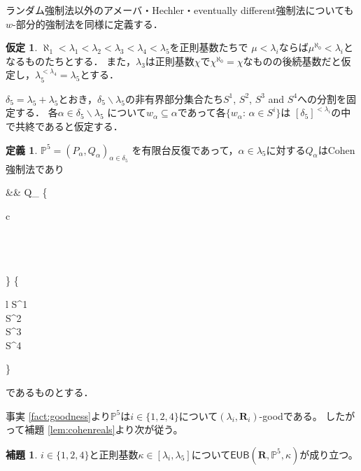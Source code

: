 \documentclass[uplatex,dvipdfmx]{jsarticle}
\newcommand{\EUB}{\mathsf{EUB}}
\newcommand{\relR}{\mathbf{R}}
\newcommand{\Pa}{\mathbb{P}^5}
\renewcommand{\setminus}{\smallsetminus}
\theoremstyle{definition}
\newtheorem{defi}[thm]{定義}
\newtheorem{lem}[thm]{補題}
\newtheorem{assumption}[thm]{仮定}
\begin{document}
	ランダム強制法以外のアメーバ・Hechler・eventually different強制法についても$w$-部分的強制法を同様に定義する．
	
	\begin{assumption}\label{asm:P}
		$\aleph_1<\lambda_1<\lambda_2<\lambda_3<\lambda_4<\lambda_5$を正則基数たちで
		$\mu<\lambda_i$ならば$\mu^{\aleph_0}<\lambda_i$となるものたちとする．
		また，$\lambda_3$は正則基数$\chi$で$\chi^{\aleph_0}=\chi$なものの後続基数だと仮定し，$\lambda_5^{<\lambda_4}=\lambda_5$とする．
		
		$\delta_5=\lambda_5+\lambda_5$とおき，$\delta_5\setminus\lambda_5$の非有界部分集合たち$S^1$, $S^2$, $S^3$ and $S^4$への分割を固定する．
		各$\alpha\in \delta_5\setminus\lambda_5$ について$w_\alpha\subseteq \alpha$であって各$\{w_\alpha:\, \alpha\in S^i\}$は $[\delta_5]^{{<}\lambda_i}$の中で共終であると仮定する．
	\end{assumption}
	
	\begin{defi}\label{def:Pa}
		$\Pa=(P_\alpha,Q_\alpha)_{\alpha\in\delta_5}$ 
		を有限台反復であって，$\alpha\in \lambda_5$に対する$Q_\alpha$はCohen強制法であり
		\begin{flalign*}
			&&
			Q_\alpha\text{ は$w_\alpha$-部分的 }
			\left\{
			\begin{array}{c}
				\\
				\\
				\\
				\\
			\end{array}\right\}
			 \hspace{0.5cm} \text{($\alpha$が}
			\left\{
			\begin{array}{l}
				S^1\\
				S^2\\
				S^3\\
				S^4\\
			\end{array}
			\right\} 
			\\
		\end{flalign*}
		であるものとする．
	\end{defi}

	事実 \ref{fact:goodness}より$\Pa$は$i\in\{1,2,4\}$について$(\lambda_i, \relR_i)$-goodである。
	したがって補題 \ref{lem:cohenreals}より次が従う。

	\begin{lem}
		$i \in \{1,2,4\}$と正則基数$\kappa \in [\lambda_i, \lambda_5]$について$\EUB(\relR, \Pa, \kappa)$が成り立つ。
	\end{lem}
\end{document}
